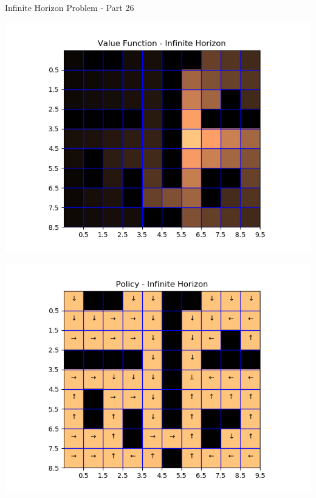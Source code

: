 \begin{questions}
\begin{question}{Infinite Horizon Problem - Part 2}{6}
\begin{answer}
\noindent\begin{minipage}{.5\textwidth}
	\centering
	\includegraphics[width=1\textwidth]{img/infinitehorizon_2c.png} 
	\label{fig:2c1}            
\end{minipage}%
\begin{minipage}{.5\textwidth}
	\centering
	\includegraphics[width=1\textwidth]{img/policy_2c.png} 
	\label{fig:2c2}               
\end{minipage}
\end{answer}


\end{question}
\end{questions}
